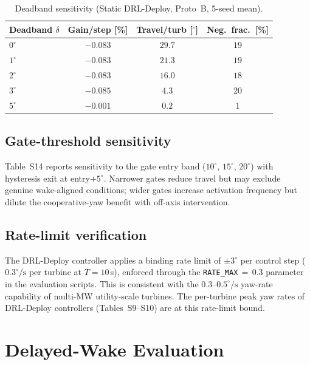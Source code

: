 \documentclass{article}
\begin{document}
\begin{table}[h]
\centering
\caption{Deadband sensitivity (Static DRL-Deploy, Proto~B, 5-seed mean).}
\label{tab:db_sens}
\small
\begin{tabular}{lccc}
\toprule
Deadband $\delta$ & Gain/step [\%] & Travel/turb [$^\circ$] & Neg.\ frac.\ [\%] \\
\midrule
$0^\circ$ & $-0.083$ & $29.7$ & $19$ \\
$1^\circ$ & $-0.083$ & $21.3$ & $19$ \\
$2^\circ$ & $-0.083$ & $16.0$ & $18$ \\
$3^\circ$ & $-0.085$ & $4.3$  & $20$ \\
$5^\circ$ & $-0.001$ & $0.2$  & $1$  \\
\bottomrule
\end{tabular}
\end{table}

\subsection{Gate-threshold sensitivity}

Table~S14 reports sensitivity to the gate entry band ($10^\circ$, $15^\circ$, $20^\circ$) with hysteresis exit at entry${+}5^\circ$. Narrower gates reduce travel but may exclude genuine wake-aligned conditions; wider gates increase activation frequency but dilute the cooperative-yaw benefit with off-axis intervention.

\subsection{Rate-limit verification}

The DRL-Deploy controller applies a binding rate limit of ${\pm}3^\circ$ per control step ($0.3^\circ\!/\!\mathrm{s}$ per turbine at $T{=}10$\,s), enforced through the \texttt{RATE\_MAX}$\,{=}\,0.3$ parameter in the evaluation scripts. This is consistent with the $0.3$--$0.5^\circ\!/\!\mathrm{s}$ yaw-rate capability of multi-MW utility-scale turbines. The per-turbine peak yaw rates of DRL-Deploy controllers (Tables~S9--S10) are at this rate-limit bound.

\section{Delayed-Wake Evaluation}\label{sec:delay_details}
\end{document}
